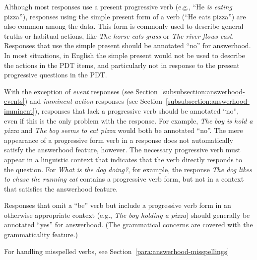 \documentclass[12pt,notitlepage]{article}
\begin{document}

Although most responses use a present progressive verb (e.g., ``He \textit{is eating} pizza''), responses using the simple present form of a verb (``He eats pizza'') are also common among the data. This form is commonly used to describe general truths or habitual actions, like \textit{The horse eats grass} or \textit{The river flows east}. Responses that use the simple present should be annotated ``no'' for answerhood. In most situations, in English the simple present would not be used to describe the actions in the PDT items, and particularly not in response to the present progressive questions in the PDT.

With the exception of \textit{event} responses (see Section~\ref{subsubsection:answerhood-events}) and \textit{imminent action} responses (see Section~\ref{subsubsection:answerhood-imminent}), responses that lack a progressive verb should be annotated ``no'', even if this is the only problem with the response. For example, \textit{The boy is hold a pizza} and \textit{The boy seems to eat pizza} would both be annotated ``no''. The mere appearance of a progressive form verb in a response does not automatically satisfy the answerhood feature, however. The necessary progressive verb must appear in a linguistic context that indicates that the verb directly responds to the question. For \textit{What is the dog doing?}, for example, the response \textit{The dog likes to chase the running cat} contains a progressive verb form, but not in a context that satisfies the answerhood feature.

Responses that omit a ``be'' verb but include a progressive verb form in an otherwise appropriate context (e.g., \textit{The boy holding a pizza}) should generally be annotated ``yes'' for answerhood. (The grammatical concerns are covered with the grammaticality feature.)

For handling misspelled verbs, see Section~\ref{para:answerhood-misspellings}
\end{document}
